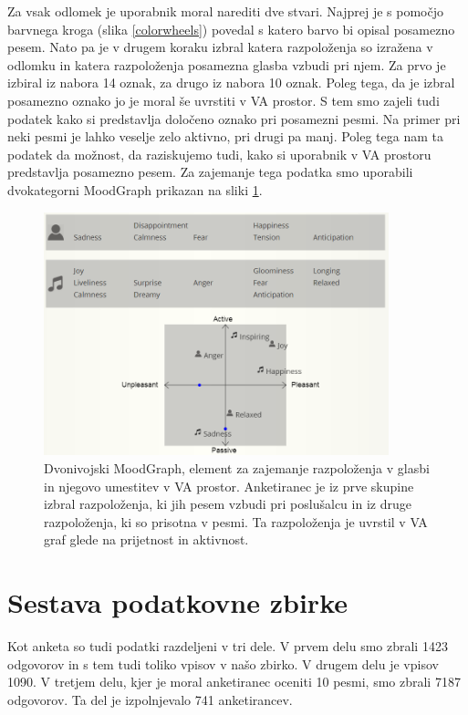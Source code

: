 \documentclass[a4paper, 12pt]{book}
\begin{document}
{Za vsak odlomek je uporabnik moral narediti dve stvari. Najprej je s pomočjo barvnega kroga (slika \ref{colorwheels}) povedal s katero barvo bi opisal posamezno pesem. Nato pa je v drugem koraku izbral katera razpoloženja so izražena v odlomku in katera razpoloženja posamezna glasba vzbudi pri njem. Za prvo je izbiral iz nabora 14 oznak, za drugo iz nabora 10 oznak. Poleg tega, da je izbral posamezno oznako jo je moral še uvrstiti v VA prostor. S tem smo zajeli tudi podatek kako si predstavlja določeno oznako pri posamezni pesmi. Na primer pri neki pesmi je lahko veselje zelo aktivno, pri drugi pa manj. Poleg tega nam ta podatek da možnost, da raziskujemo tudi, kako si uporabnik v VA prostoru predstavlja posamezno pesem. Za zajemanje tega podatka smo uporabili dvokategorni MoodGraph prikazan na sliki \ref{moodgraphdvo}.

\begin{figure}[htb]
\centering
\includegraphics[width=10cm]{images/moodgraphdvo.png}

\caption{Dvonivojski MoodGraph, element za zajemanje razpoloženja v glasbi in njegovo umestitev v VA prostor. Anketiranec je iz prve skupine izbral razpoloženja, ki jih pesem vzbudi pri poslušalcu in iz druge razpoloženja, ki so prisotna v pesmi. Ta razpoloženja je uvrstil v VA graf glede na prijetnost in aktivnost.}
\label{moodgraphdvo}
\end{figure}


\section{Sestava podatkovne zbirke}



Kot anketa so tudi podatki razdeljeni v tri dele. V prvem delu smo zbrali 1423 odgovorov in s tem tudi toliko vpisov v našo zbirko. V drugem delu je vpisov 1090. V tretjem delu, kjer je moral anketiranec oceniti 10 pesmi, smo zbrali 7187 odgovorov. Ta del je izpolnjevalo 741 anketirancev.

}
\end{document}
